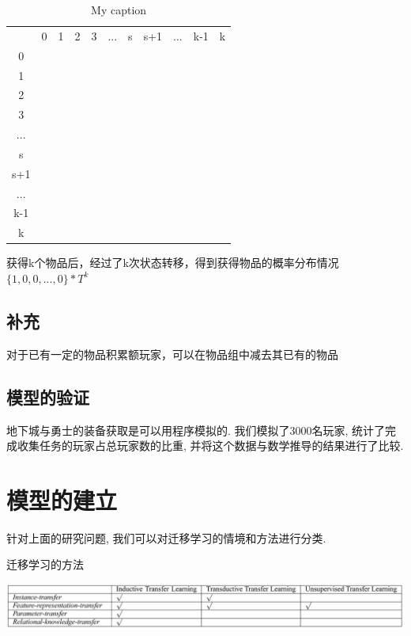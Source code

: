 \documentclass[10pt,journal,compsoc]{IEEEtran}
\begin{document}
  \begin{table}[]
    \centering
    \caption{My caption}
    \label{my-label}
    \begin{tabular}{ccccccccccc}
        & 0 & 1 & 2 & 3 & ... & s & s+1 & ... & k-1 & k \\
    0   &   &   &   &   &     &   &     &     &     &   \\
    1   &   &   &   &   &     &   &     &     &     &   \\
    2   &   &   &   &   &     &   &     &     &     &   \\
    3   &   &   &   &   &     &   &     &     &     &   \\
    ... &   &   &   &   &     &   &     &     &     &   \\
    s   &   &   &   &   &     &   &     &     &     &   \\
    s+1 &   &   &   &   &     &   &     &     &     &   \\
    ... &   &   &   &   &     &   &     &     &     &   \\
    k-1 &   &   &   &   &     &   &     &     &     &   \\
    k   &   &   &   &   &     &   &     &     &     &  
    \end{tabular}
    \end{table}
  
  获得k个物品后，经过了k次状态转移，得到获得物品的概率分布情况$\{1,0,0,...,0\}*T^k$




  \subsection{补充}
  对于已有一定的物品积累额玩家，可以在物品组中减去其已有的物品


  \subsection{模型的验证}
    地下城与勇士的装备获取是可以用程序模拟的. 我们模拟了3000名玩家, 统计了完成收集任务的玩家占总玩家数的比重, 并将这个数据与数学推导的结果进行了比较. 

\section{模型的建立}

针对上面的研究问题, 我们可以对迁移学习的情境和方法进行分类. 

\begin{table}[!ht]
\centering
\caption{迁移学习的方法}
\label{tab:survey_method}
\includegraphics[width=40pc]{img/survey_tab3.jpg}
\end{table}
\end{document}
